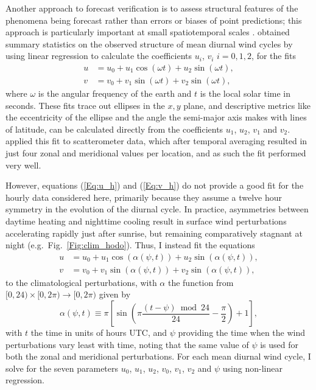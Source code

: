 \documentclass{ametsoc}
\begin{document}
Another approach to forecast verification is to assess structural features of the phenomena being forecast rather than errors or biases of point predictions; this approach is particularly important at small spatiotemporal scales \citep[e.g.][]{mass02, rife05}. \citet{gille05} obtained summary statistics on the observed structure of mean diurnal wind cycles by using linear regression to calculate the coefficients $u_i$, $v_i$ $i=0,1,2$, for the fits 
\begin{align}
u &= u_0 + u_1 \cos(\omega t) + u_2 \sin(\omega t), \label{Eq:u_h} \\
v &= v_0 + v_1 \sin(\omega t) + v_2 \sin(\omega t), \label{Eq:v_h}
\end{align}
where $\omega$ is the angular frequency of the earth and $t$ is the local solar time in seconds. These fits trace out ellipses in the $x,y$ plane, and descriptive metrics like the eccentricity of the ellipse and the angle the semi-major axis makes with lines of latitude, can be calculated directly from the coefficients $u_1$, $u_2$, $v_1$ and $v_2$. \citet{gille05} applied this fit to scatterometer data, which after temporal averaging resulted in just four zonal and meridional values per location, and as such the fit performed very well.  

However, equations (\ref{Eq:u_h}) and (\ref{Eq:v_h}) do not provide a good fit for the hourly data considered here, primarily because they assume a twelve hour symmetry in the evolution of the diurnal cycle. In practice, asymmetries between daytime heating and nighttime cooling \citep[e.g.][]{svensson11} result in surface wind perturbations accelerating rapidly just after sunrise, but remaining comparatively stagnant at night (e.g.~Fig.~\ref{Fig:clim_hodo}). Thus, I instead fit the equations
\begin{align}
u &= u_0 + u_1 \cos(\alpha(\psi,t)) + u_2 \sin(\alpha(\psi,t)), \label{Eq:u} \\
v &= v_0 + v_1 \sin(\alpha(\psi,t)) + v_2 \sin(\alpha(\psi,t)), \label{Eq:v}
\end{align}
to the climatological perturbations, with $\alpha$ the function from $[0,24) \times [0, 2\pi) \to [0, 2\pi)$ given by
\begin{equation}
\alpha(\psi,t) \equiv \pi \left[\sin\left( \pi \frac{(t - \psi)  \bmod 24}{24} - \frac{\pi}{2} \right) + 1 \right], \label{Eq:alpha}
\end{equation}
with $t$ the time in units of hours UTC, and $\psi$ providing the time when the wind perturbations vary least with time, noting that the same value of $\psi$ is used for both the zonal and meridional perturbations. For each mean diurnal wind cycle, I solve for the seven parameters $u_0$, $u_1$, $u_2$, $v_0$, $v_1$, $v_2$ and $\psi$ using non-linear regression.
\end{document}
